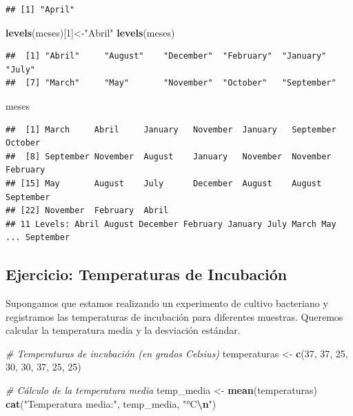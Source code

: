\documentclass[
]{book}
\newenvironment{Shaded}{\begin{snugshade}}{\end{snugshade}}
\newcommand{\CommentTok}[1]{\textcolor[rgb]{0.56,0.35,0.01}{\textit{#1}}}
\newcommand{\DecValTok}[1]{\textcolor[rgb]{0.00,0.00,0.81}{#1}}
\newcommand{\FunctionTok}[1]{\textcolor[rgb]{0.13,0.29,0.53}{\textbf{#1}}}
\newcommand{\NormalTok}[1]{#1}
\newcommand{\OtherTok}[1]{\textcolor[rgb]{0.56,0.35,0.01}{#1}}
\newcommand{\SpecialCharTok}[1]{\textcolor[rgb]{0.81,0.36,0.00}{\textbf{#1}}}
\newcommand{\StringTok}[1]{\textcolor[rgb]{0.31,0.60,0.02}{#1}}
\begin{document}
\begin{verbatim}
## [1] "April"
\end{verbatim}

\begin{Shaded}
\begin{Highlighting}[]
\FunctionTok{levels}\NormalTok{(meses)[}\DecValTok{1}\NormalTok{]}\OtherTok{\textless{}{-}}\StringTok{"Abril"}
\FunctionTok{levels}\NormalTok{(meses)}
\end{Highlighting}
\end{Shaded}

\begin{verbatim}
##  [1] "Abril"     "August"    "December"  "February"  "January"   "July"     
##  [7] "March"     "May"       "November"  "October"   "September"
\end{verbatim}

\begin{Shaded}
\begin{Highlighting}[]
\NormalTok{meses}
\end{Highlighting}
\end{Shaded}

\begin{verbatim}
##  [1] March     Abril     January   November  January   September October  
##  [8] September November  August    January   November  November  February 
## [15] May       August    July      December  August    August    September
## [22] November  February  Abril    
## 11 Levels: Abril August December February January July March May ... September
\end{verbatim}

\subsection{Ejercicio: Temperaturas de Incubación}\label{ejercicio-temperaturas-de-incubaciuxf3n}

Supongamos que estamos realizando un experimento de cultivo bacteriano y registramos las temperaturas de incubación para diferentes muestras. Queremos calcular la temperatura media y la desviación estándar.

\begin{Shaded}
\begin{Highlighting}[]
\CommentTok{\# Temperaturas de incubación (en grados Celsius)}
\NormalTok{temperaturas }\OtherTok{\textless{}{-}} \FunctionTok{c}\NormalTok{(}\DecValTok{37}\NormalTok{, }\DecValTok{37}\NormalTok{, }\DecValTok{25}\NormalTok{, }\DecValTok{30}\NormalTok{, }\DecValTok{30}\NormalTok{, }\DecValTok{37}\NormalTok{, }\DecValTok{25}\NormalTok{, }\DecValTok{25}\NormalTok{)}

\CommentTok{\# Cálculo de la temperatura media}
\NormalTok{temp\_media }\OtherTok{\textless{}{-}} \FunctionTok{mean}\NormalTok{(temperaturas)}
\FunctionTok{cat}\NormalTok{(}\StringTok{"Temperatura media:"}\NormalTok{, temp\_media, }\StringTok{"°C}\SpecialCharTok{\textbackslash{}n}\StringTok{"}\NormalTok{)}
\end{Highlighting}
\end{Shaded}
\end{document}
